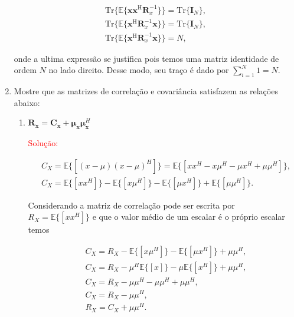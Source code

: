 \documentclass[a4paper,10pt]{article}
\begin{document}
\begin{enumerate}
				\begin{align}
					\text{Tr}\{\mathbb{E}\{\mathbf{x} \mathbf{x}^{\text{H}}\mathbf{R}^{-1}_{x}\}\} = \text{Tr}\{\mathbf{I}_{N}\}, \\
					\text{Tr}\{\mathbb{E}\{\mathbf{x}^{\text{H}}\mathbf{R}^{-1}_{x} \mathbf{x}\}\} = \text{Tr}\{\mathbf{I}_{N}\}, \\
					\text{Tr}\{\mathbb{E}\{\mathbf{x}^{\text{H}}\mathbf{R}^{-1}_{x} \mathbf{x}\}\} = N,
				\end{align}
			
				onde a ultima expressão se justifica pois temos uma matriz identidade de ordem $N$ no lado direito. Desse modo, seu traço é dado por $\sum^{N}_{i = 1} 1 = N$.
				
			\item Mostre que as matrizes de correlação e covariância satisfazem as relações abaixo:
				
				\begin{enumerate}
					
					\item $\mathbf{R}_\mathbf{x} = \mathbf{C}_\mathbf{x} + {\mathbf{\mu}}_{\mathbf{x}}{\mathbf{\mu}}_{\mathbf{x}}^H$
					
						\textcolor{red}{Solução:}
						
						\begin{align}
							&C_{X} = \mathbb{E}\{[(x - \mu)(x - \mu)^{H}]\} = \mathbb{E}\{[xx^{H} -x\mu^{H} - \mu x^{H} + \mu \mu^{H}]\}, \\
							&C_{X} = \mathbb{E}\{[xx^{H}]\} -\mathbb{E}\{[x\mu^{H}]\} - \mathbb{E}\{[\mu x^{H}]\} + \mathbb{E}\{[\mu \mu^{H}]\}.
						\end{align}
						
						
						Considerando a matriz de correlação pode ser escrita por $R_{X} = \mathbb{E}\{[xx^{H}]\}$ e que o valor médio de um escalar é o próprio escalar temos
						
						\begin{align}
							&C_{X} = R_{X} - \mathbb{E}\{[x\mu^{H}]\} - \mathbb{E}\{[\mu x^{H}]\} + \mu \mu^{H}, \\
							&C_{X} = R_{X} - \mu^{H}\mathbb{E}\{[x]\} - \mu \mathbb{E}\{[x^{H}]\} + \mu \mu^{H}, \\
							&C_{X} = R_{X} - \mu \mu^{H} - \mu \mu^{H} + \mu \mu^{H}, \\
							&C_{X} = R_{X} - \mu \mu^{H}, \\
							&R_{X} = C_{X} + \mu \mu^{H}.
						\end{align}
					

\end{enumerate}
\end{enumerate}
\end{document}
